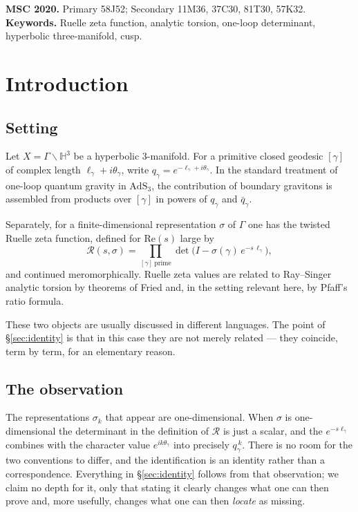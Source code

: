 \documentclass[11pt,a4paper]{article}
\theoremstyle{definition}
\theoremstyle{remark}
\newcommand{\HH}{\mathbb{H}}
\newcommand{\Rz}{\mathcal{R}}
\begin{document}
\medskip\noindent\small\textbf{MSC 2020.} Primary 58J52; Secondary 11M36, 37C30, 81T30, 57K32.\\
\textbf{Keywords.} Ruelle zeta function, analytic torsion, one-loop determinant, hyperbolic three-manifold, cusp.\normalsize


\section{Introduction}

\subsection{Setting}

Let $X=\Gamma\backslash\HH^3$ be a hyperbolic $3$-manifold. For a primitive closed geodesic
$[\gamma]$ of complex length $\ell_\gamma+i\theta_\gamma$, write
$q_\gamma=e^{-\ell_\gamma+i\theta_\gamma}$. In the standard treatment of one-loop quantum
gravity in $\mathrm{AdS}_3$, the contribution of boundary gravitons is assembled from products
over $[\gamma]$ in powers of $q_\gamma$ and $\bar q_\gamma$.

Separately, for a finite-dimensional representation $\sigma$ of $\Gamma$ one has the twisted
Ruelle zeta function, defined for $\mathrm{Re}(s)$ large by
\[
   \Rz(s,\sigma)=\prod_{[\gamma]\ \mathrm{prime}}
      \det\bigl(I-\sigma(\gamma)\,e^{-s\,\ell_\gamma}\bigr),
\]
and continued meromorphically. Ruelle zeta values are related to Ray--Singer analytic torsion
by theorems of Fried and, in the setting relevant here, by Pfaff's ratio formula.

These two objects are usually discussed in different languages. The point of \S\ref{sec:identity}
is that in this case they are not merely related --- they coincide, term by term, for an
elementary reason.

\subsection{The observation}

The representations $\sigma_k$ that appear are one-dimensional. When $\sigma$ is
one-dimensional the determinant in the definition of $\Rz$ is just a scalar, and the
$e^{-s\ell_\gamma}$ combines with the character value $e^{ik\theta_\gamma}$ into precisely
$q_\gamma^{\,k}$. There is no room for the two conventions to differ, and the identification is
an identity rather than a correspondence. Everything in \S\ref{sec:identity} follows from that
observation; we claim no depth for it, only that stating it clearly changes what one can then
prove and, more usefully, changes what one can then \emph{locate} as missing.
\end{document}

